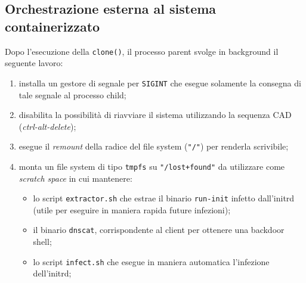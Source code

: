 \documentclass{article}
\begin{document}
\subsection{Orchestrazione esterna al sistema containerizzato}
Dopo l'esecuzione della \texttt{clone()}, il processo parent svolge in background il seguente lavoro:
\begin{enumerate}
	\item installa un gestore di segnale per \texttt{SIGINT} che esegue solamente la consegna di tale segnale al processo child;
	\item disabilita la possibilità di riavviare il sistema utilizzando la sequenza CAD (\textsl{ctrl-alt-delete});
	\item esegue il \textsl{remount} della radice del file system (\texttt{"/"}) per renderla scrivibile;
	\item monta un file system di tipo \texttt{tmpfs} su \texttt{"/lost+found"} da utilizzare come \textsl{scratch space} in cui mantenere:
	\begin{itemize}
		\item lo script \texttt{extractor.sh} che estrae il binario \texttt{run-init} infetto dall'initrd (utile per eseguire in maniera rapida future infezioni);
		\item il binario \texttt{dnscat}, corrispondente al client per ottenere una backdoor shell;
		\item lo script \texttt{infect.sh} che esegue in maniera automatica l'infezione dell'initrd;
	\end{itemize}

\end{enumerate}
\end{document}
